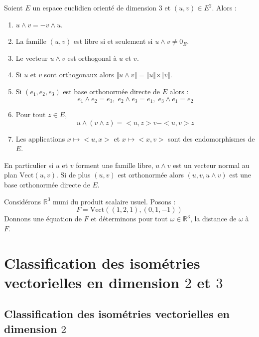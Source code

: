 \documentclass[a4paper,10pt]{report}
\begin{document}
\begin{preuve}

\vspace{7cm}
\end{preuve}

\begin{prop}
Soient $E$ un espace euclidien orienté de dimension $3$ et $(u,v) \in E^2$. Alors :
\begin{enumerate}
\item $u \wedge v = - v \wedge u$.
\item La famille $(u,v)$ est libre si et seulement si $u \wedge v \neq 0_E$.
\item Le vecteur $u \wedge v$ est orthogonal à $u$ et $v$.
\item Si $u$ et $v$ sont orthogonaux alors $\Vert u \wedge v \Vert = \Vert u \Vert \times \Vert v \Vert$.
\item Si $(e_1,e_2,e_3)$ est base orthonormée directe de $E$ alors :
$$ e_1 \wedge e_2 = e_3, \; e_2 \wedge e_3 = e_1 , \; e_3 \wedge e_1 = e_2 $$
\item Pour tout $z \in E$,
$$ u \wedge (v \wedge z) =<u,z>v-<u,v>z$$
\item Les applications $x \mapsto <u,x>$ et $x \mapsto <x,v>$ sont des endomorphismes de $E$.
\end{enumerate}
\end{prop}

\begin{rem} En particulier si $u$ et $v$ forment une famille libre, $u \wedge v$ est un vecteur normal au plan $\textrm{Vect}(u,v)$. Si de plus $(u,v)$ est orthonormée alors $(u,v,u \wedge v)$ est une base orthonormée directe de $E$.
\end{rem}

\begin{ex} Considérons $\mathbb{R}^3$ muni du produit scalaire usuel. Posons :
$$ F = \textrm{Vect}((1,2,1),(0,1,-1))$$
Donnons une équation de $F$ et déterminons pour tout $\omega \in \mathbb{R}^3$, la distance de $\omega$ à $F$.

\vspace{6cm}
\end{ex}

\section{Classification des isométries vectorielles en dimension $2$ et $3$}
\subsection{Classification des isométries vectorielles en dimension $2$}
\end{document}
